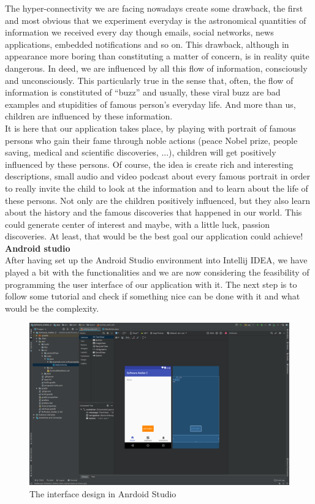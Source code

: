 \documentclass[12pt]{scrartcl}
\begin{document}
	The hyper-connectivity we are facing nowadays create some drawback, the first and most obvious that we experiment everyday is the astronomical quantities of information we received every day though emails, social networks, news applications, embedded notifications and so on. This drawback, although in appearance more boring than constituting a matter of concern, is in reality quite dangerous. In deed, we are influenced by all this flow of information, consciously and unconsciously. This particularly true in the sense that, often, the flow of information is constituted of ``buzz” and usually, these viral buzz are bad examples and stupidities of famous person’s everyday life. And more than us, children are influenced by these information.\\

	It is here that our application takes place, by playing with portrait of famous persons who gain their fame through noble actions (peace Nobel prize, people saving, medical and scientific discoveries, ...), children will get positively influenced by these persons. Of course, the idea is create rich and interesting descriptions, small audio and video podcast about every famous portrait in order to really invite the child to look at the information and to learn about the life of these persons. Not only are the children positively influenced, but they also learn about the history and the famous discoveries that happened in our world. This could generate center of interest and maybe, with a little luck, passion discoveries. At least, that would be the best goal our application could achieve!\\

	\textbf{Android studio}\\

	After having set up the Android Studio environment into Intellij IDEA, we have played a bit with the functionalities and we are now considering the feasibility of programming the user interface of our application with it. The next step is to follow some tutorial and check if something nice can be done with it and what would be the complexity.\\

	\begin{figure}[H]
        		\centering
       		\includegraphics[width=\textwidth]{../images/androidStudio1.png}
       		\caption{The interface design in Anrdoid Studio}
        		\label{androirdStudio1}
	\end{figure}
	
\end{document}
